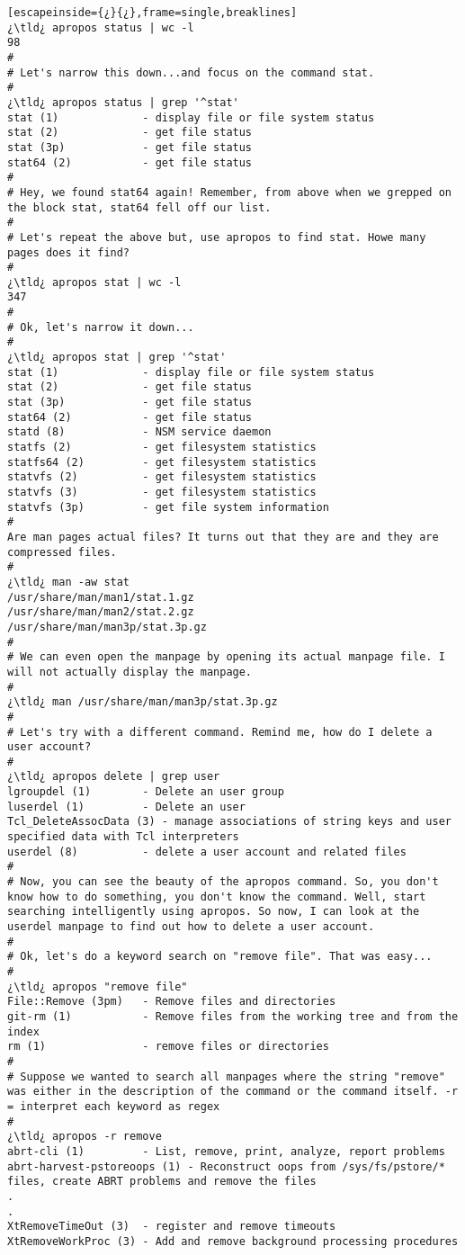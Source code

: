 \begin{lstlisting}[escapeinside={¿}{¿},frame=single,breaklines]
¿\tld¿ apropos status | wc -l
98
#
# Let's narrow this down...and focus on the command stat.
#
¿\tld¿ apropos status | grep '^stat'
stat (1)             - display file or file system status
stat (2)             - get file status
stat (3p)            - get file status
stat64 (2)           - get file status
#
# Hey, we found stat64 again! Remember, from above when we grepped on the block stat, stat64 fell off our list. 
#
# Let's repeat the above but, use apropos to find stat. Howe many pages does it find?
#
¿\tld¿ apropos stat | wc -l
347
#
# Ok, let's narrow it down...
#
¿\tld¿ apropos stat | grep '^stat'
stat (1)             - display file or file system status
stat (2)             - get file status
stat (3p)            - get file status
stat64 (2)           - get file status
statd (8)            - NSM service daemon
statfs (2)           - get filesystem statistics
statfs64 (2)         - get filesystem statistics
statvfs (2)          - get filesystem statistics
statvfs (3)          - get filesystem statistics
statvfs (3p)         - get file system information
#
Are man pages actual files? It turns out that they are and they are compressed files.
#
¿\tld¿ man -aw stat
/usr/share/man/man1/stat.1.gz
/usr/share/man/man2/stat.2.gz
/usr/share/man/man3p/stat.3p.gz
#
# We can even open the manpage by opening its actual manpage file. I will not actually display the manpage.
#
¿\tld¿ man /usr/share/man/man3p/stat.3p.gz
#
# Let's try with a different command. Remind me, how do I delete a user account?
#
¿\tld¿ apropos delete | grep user
lgroupdel (1)        - Delete an user group
luserdel (1)         - Delete an user
Tcl_DeleteAssocData (3) - manage associations of string keys and user specified data with Tcl interpreters
userdel (8)          - delete a user account and related files
#
# Now, you can see the beauty of the apropos command. So, you don't know how to do something, you don't know the command. Well, start searching intelligently using apropos. So now, I can look at the userdel manpage to find out how to delete a user account.
#
# Ok, let's do a keyword search on "remove file". That was easy...
#
¿\tld¿ apropos "remove file"
File::Remove (3pm)   - Remove files and directories
git-rm (1)           - Remove files from the working tree and from the index
rm (1)               - remove files or directories
#
# Suppose we wanted to search all manpages where the string "remove" was either in the description of the command or the command itself. -r = interpret each keyword as regex
#
¿\tld¿ apropos -r remove
abrt-cli (1)         - List, remove, print, analyze, report problems
abrt-harvest-pstoreoops (1) - Reconstruct oops from /sys/fs/pstore/* files, create ABRT problems and remove the files
.
.
XtRemoveTimeOut (3)  - register and remove timeouts
XtRemoveWorkProc (3) - Add and remove background processing procedures
\end{lstlisting}

